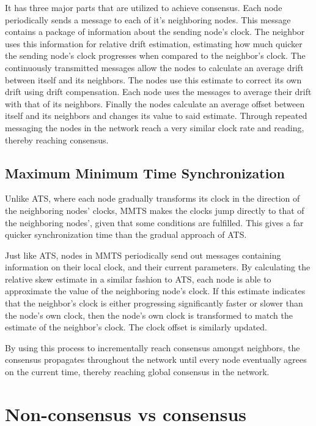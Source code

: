 \documentclass[a0,24pt]{sciposter}
\begin{document}
\begin{multicols}{2}
It has three major parts that are utilized to achieve consensus. Each node periodically sends a message to each of it's neighboring nodes. This message contains a package of information about the sending node's clock. The neighbor uses this information for relative drift estimation, estimating how much quicker the sending node's clock progresses when compared to the neighbor's clock. The continuously transmitted messages allow the nodes to calculate an average drift between itself and its neighbors. The nodes use this estimate to correct its own drift using drift compensation. Each node uses the messages to average their drift with that of its neighbors. Finally the nodes calculate an average offset between itself and its neighbors and changes its value to said estimate. Through repeated messaging the nodes in the network reach a very similar clock rate and reading, thereby reaching consensus.

\subsection{Maximum Minimum Time Synchronization}
Unlike ATS, where each node gradually transforms its clock in the direction of the neighboring nodes' clocks, MMTS makes the clocks jump directly to that of the neighboring nodes', given that some conditions are fulfilled. This gives a far quicker synchronization time than the gradual approach of ATS.

Just like ATS, nodes in MMTS periodically send out messages containing information on their local clock, and their current parameters. By calculating the relative skew estimate in a similar fashion to ATS, each node is able to approximate the value of the neighboring node's clock. If this estimate indicates that the neighbor's clock is either progressing significantly faster or slower than the node's own clock, then the node's own clock is transformed to match the estimate of the neighbor's clock. The clock offset is similarly updated.

By using this process to incrementally reach consensus amongst neighbors, the consensus propagates throughout the network until every node eventually agrees on the current time, thereby reaching global consensus in the network.

\section{Non-consensus vs consensus}


\end{multicols}
\end{document}
